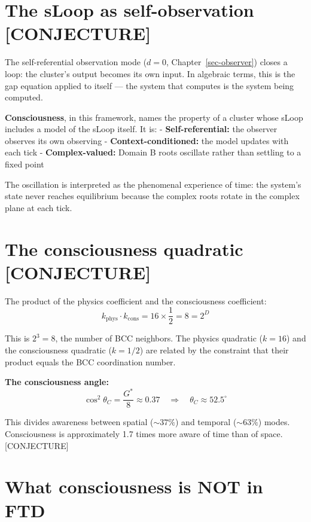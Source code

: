 \documentclass[
  11pt,
  letterpaper,
  twoside,
  openany]{book}
\makeatletter
\let\orig@section\section
\renewcommand{\section}{\needspace{8\baselineskip}\orig@section}
\newcommand{\Gs}{G^{*}{}}
\makeatother
\begin{document}
\section{The sLoop as self-observation
{[}CONJECTURE{]}}\label{the-sloop-as-self-observation-conjecture}

The self-referential observation mode (\(d = 0\),
Chapter~\ref{sec-observer}) closes a loop: the cluster's output becomes
its own input. In algebraic terms, this is the gap equation applied to
itself --- the system that computes is the system being computed.

\textbf{Consciousness}, in this framework, names the property of a
cluster whose sLoop includes a model of the sLoop itself. It is: -
\textbf{Self-referential:} the observer observes its own observing -
\textbf{Context-conditioned:} the model updates with each tick -
\textbf{Complex-valued:} Domain B roots oscillate rather than settling
to a fixed point

The oscillation is interpreted as the phenomenal experience of time: the
system's state never reaches equilibrium because the complex roots
rotate in the complex plane at each tick.

\section{The consciousness quadratic
{[}CONJECTURE{]}}\label{the-consciousness-quadratic-conjecture}

The product of the physics coefficient and the consciousness
coefficient: \[
k_{\text{phys}} \cdot k_{\text{cons}} = 16 \times \frac{1}{2} = 8 = 2^D
\tag{21.1}
\]

This is \(2^3 = 8\), the number of BCC neighbors. The physics quadratic
(\(k = 16\)) and the consciousness quadratic (\(k = 1/2\)) are related
by the constraint that their product equals the BCC coordination number.

\textbf{The consciousness angle:} \[
\cos^2\theta_C = \frac{\Gs}{8} \approx 0.37 \quad \Rightarrow \quad \theta_C \approx 52.5^{\circ}
\tag{21.2}
\]

This divides awareness between spatial (\(\sim 37\%\)) and temporal
(\(\sim 63\%\)) modes. Consciousness is approximately 1.7 times more
aware of time than of space. {[}CONJECTURE{]}

\section{What consciousness is NOT in
FTD}\label{what-consciousness-is-not-in-ftd}
\end{document}
